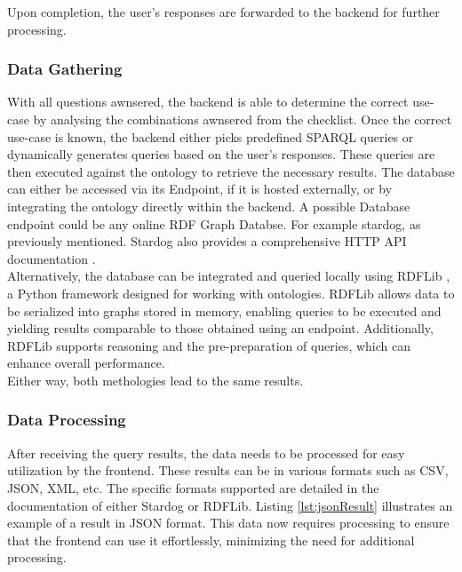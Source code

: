\documentclass[
  a4paper,  %
  twoside,  %
  bibliography=totoc,
  headsepline,
  cleardoublepage=empty,
  parskip=half,
  draft=false
]{scrbook}
\begin{document}
Upon completion, the user's responses are forwarded to the backend for further processing.

\subsubsection{Data Gathering}
With all questions awnsered, the backend is able to determine the correct use-case by analysing the combinations awnsered from the checklist. Once the correct use-case is known, the backend either picks predefined SPARQL queries or dynamically generates queries based on the user's responses. These queries are then executed against the ontology to retrieve the necessary results. The database can either be accessed via its Endpoint, if it is hosted externally, or by integrating the ontology directly within the backend. A possible Database endpoint could be any online RDF Graph Databse. For example stardog, as previously mentioned. Stardog also provides a comprehensive HTTP API documentation \cite{StardogHTTPDocs}. \\
Alternatively, the database can be integrated and queried locally using RDFLib \cite{RDFLibDocs}, a Python framework designed for working with ontologies. RDFLib allows data to be serialized into graphs stored in memory, enabling queries to be executed and yielding results comparable to those obtained using an endpoint. Additionally, RDFLib supports reasoning and the pre-preparation of queries, which can enhance overall performance.\\
Either way, both methologies lead to the same results. 

\subsubsection{Data Processing}
After receiving the query results, the data needs to be processed for easy utilization by the frontend. These results can be in various formats such as CSV, JSON, XML, etc. The specific formats supported are detailed in the documentation of either Stardog or RDFLib. Listing \ref{lst:jsonResult} illustrates an example of a result in JSON format. This data now requires processing to ensure that the frontend can use it effortlessly, minimizing the need for additional processing.
\end{document}
